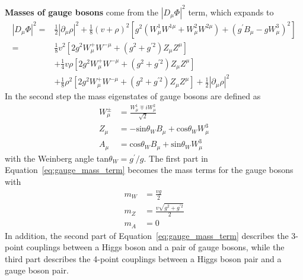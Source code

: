 \textbf{Masses of gauge bosons} come from the $|D_{\mu}\Phi|^2$ term, which expands to
\begin{equation}\label{eq:gauge_mass_term}
  \begin{split}
    |D_{\mu}\Phi|^{2} = & \frac{1}{2}|\partial_{\mu}\rho|^{2} 
                        + \frac{1}{8}(v+\rho)^{2} [g^{2}(W^{1}_{\mu}W^{1\mu} + W^{2}_{\mu}W^{2\mu}) + (g^{\prime}B_{\mu}-gW^{3}_{\mu})^{2}] \\
                      = & \frac{1}{8}v^{2} [2g^{2}W^{+}_{\mu}W^{-\mu} + (g^{2}+g^{\prime 2})Z_{\mu}Z^{\mu}] \\
                        & + \frac{1}{4}v\rho [2g^{2}W^{+}_{\mu}W^{-\mu} + (g^{2}+g^{\prime 2})Z_{\mu}Z^{\mu}] \\
                        & + \frac{1}{8}\rho^{2} [2g^{2}W^{+}_{\mu}W^{-\mu} + (g^{2}+g^{\prime 2})Z_{\mu}Z^{\mu}] + \frac{1}{2}|\partial_{\mu}\rho|^{2}
  \end{split}
\end{equation}
In the second step the mass eigenstates of gauge bosons are defined as  
\begin{equation}\label{eq:V_boson_def}
  \begin{split}
    W^{\pm}_{\mu} & = \frac{W^{1}_{\mu} \mp iW^{2}_{\mu}}{\sqrt{2}} \\
    Z_{\mu} & = -\text{sin}\theta_{W} B_{\mu} + \text{cos}\theta_{W} W^{3}_{\mu} \\
    A_{\mu} & = \text{cos}\theta_{W} B_{\mu} + \text{sin}\theta_{W} W^{3}_{\mu}
  \end{split}
\end{equation}
with the Weinberg angle tan$\theta_{W} = g^{\prime}/g$.
The first part in Equation~\ref{eq:gauge_mass_term} becomes the mass terms for the gauge bosons with
\begin{equation}\label{eq:gauge_mass}
  \begin{split}
    m_{W} & = \frac{vg}{2} \\
    m_{Z} & = \frac{v\sqrt{g^{2}+g^{\prime 2}}}{2} \\
    m_{A} & = 0
  \end{split}
\end{equation}
In addition, the second part of Equation~\ref{eq:gauge_mass_term} describes the 3-point couplings between a Higgs boson and a pair of gauge bosons,
while the third part describes the 4-point couplings between a Higgs boson pair and a gauge boson pair.

